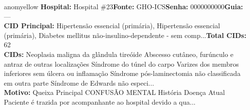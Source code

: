 \documentclass[a4paper,10pt]{article}
\begin{document}
\begin{anomalycard}[Interna\c{c}\~{a}o \#308 | Pac. \#373 | MODERADO (z=2.81) | LOS: 27d | 24/02/2026\,$\to$\,—]{anomyellow}
\textbf{Hospital:} Hospital \#23\quad \textbf{Fonte:} GHO-ICS\quad \textbf{Senha:} 0000000000\quad \textbf{Guia:} ---\\

\textbf{CID Principal:} {\small Hipertensão essencial (primária), Hipertensão essencial (primária), Diabetes mellitus não-insulino-dependente - sem comp...}\quad\textbf{Total CIDs:} 62\\

\textbf{CIDs:} {\scriptsize Neoplasia maligna da glândula tireóide \textbar{} Abscesso cutâneo, furúnculo e antraz de outras localizações \textbar{} Síndrome do túnel do carpo \textbar{} Varizes dos membros inferiores sem úlcera ou inflamação \textbar{} Síndrome pós-laminectomia não classificada em outra parte \textbar{} Síndrome de Edwards não especi...}\\

\textbf{Motivo:} {\scriptsize Queixa Principal    CONFUSÃO MENTAL    História Doença Atual    Paciente é trazida por acompanhante ao hospital devido a qua...}\\

\end{anomalycard}
\end{document}
